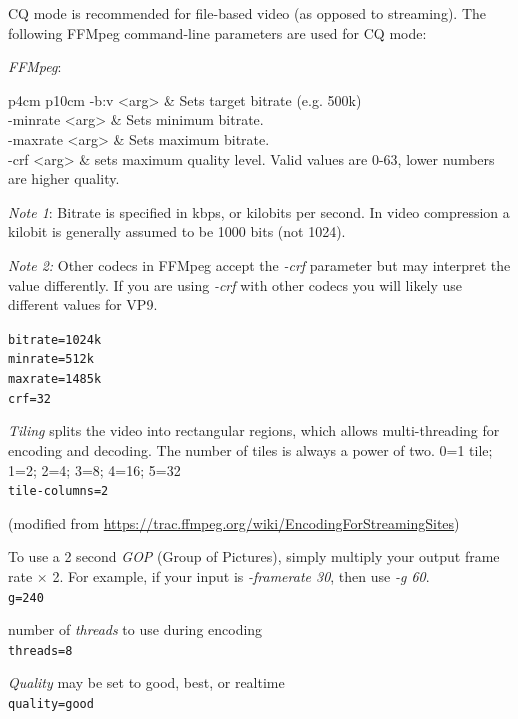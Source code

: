 CQ mode is recommended for file-based video (as opposed to streaming). The following FFMpeg command-line parameters are used for CQ mode:

\textit{FFMpeg}:

\begin{center}
	\begin{tabular}{{p{4cm} p{10cm}}}
	-b:v <arg> & Sets target bitrate (e.g. 500k)\\
	-minrate <arg> & Sets minimum bitrate.\\
	-maxrate <arg> & Sets maximum bitrate.\\
	-crf <arg> & sets maximum quality level. Valid values are 0-63, lower numbers are higher quality.\\
\end{tabular}
\end{center}

\textit{Note 1}: Bitrate is specified in kbps, or kilobits per second. In video compression a kilobit is generally assumed to be 1000 bits (not 1024).

\textit{Note 2:} Other codecs in FFMpeg accept the \textit{-crf} parameter but may interpret the value differently. If you are using \textit{-crf} with other codecs you will likely use different values for VP9.

\texttt{bitrate=1024k}\\
\texttt{minrate=512k}\\
\texttt{maxrate=1485k}\\
\texttt{crf=32}

\textit{Tiling} splits the video into rectangular regions, which allows multi-threading for encoding and decoding. The number of tiles is always a power of two. 0=1 tile; 1=2; 2=4; 3=8; 4=16; 5=32\\
\texttt{tile-columns=2}

(modified from {\small \url{https://trac.ffmpeg.org/wiki/EncodingForStreamingSites}})

To use a 2 second \textit{GOP} (Group of Pictures), simply multiply your output frame rate $\times$ 2. For example, if your input is \textit{-framerate 30}, then use \textit{-g 60}.\\
\texttt{g=240}

number of \textit{threads} to use during encoding\\
\texttt{threads=8}

\textit{Quality} may be set to good, best, or realtime\\
\texttt{quality=good}

